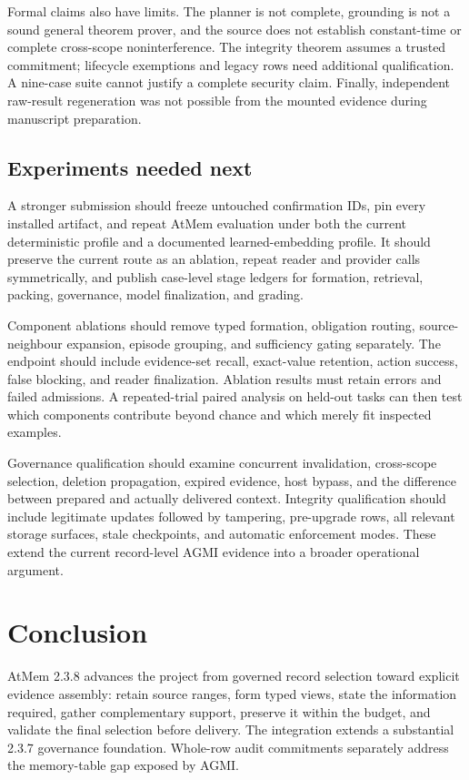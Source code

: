 \documentclass[11pt]{article}
\begin{document}
Formal claims also have limits. The planner is not complete, grounding is not a sound general theorem prover, and the source does not establish constant-time or complete cross-scope noninterference. The integrity theorem assumes a trusted commitment; lifecycle exemptions and legacy rows need additional qualification. A nine-case suite cannot justify a complete security claim. Finally, independent raw-result regeneration was not possible from the mounted evidence during manuscript preparation.

\subsection{Experiments needed next}
A stronger submission should freeze untouched confirmation IDs, pin every installed artifact, and repeat AtMem evaluation under both the current deterministic profile and a documented learned-embedding profile. It should preserve the current route as an ablation, repeat reader and provider calls symmetrically, and publish case-level stage ledgers for formation, retrieval, packing, governance, model finalization, and grading.

Component ablations should remove typed formation, obligation routing, source-neighbour expansion, episode grouping, and sufficiency gating separately. The endpoint should include evidence-set recall, exact-value retention, action success, false blocking, and reader finalization. Ablation results must retain errors and failed admissions. A repeated-trial paired analysis on held-out tasks can then test which components contribute beyond chance and which merely fit inspected examples.

Governance qualification should examine concurrent invalidation, cross-scope selection, deletion propagation, expired evidence, host bypass, and the difference between prepared and actually delivered context. Integrity qualification should include legitimate updates followed by tampering, pre-upgrade rows, all relevant storage surfaces, stale checkpoints, and automatic enforcement modes. These extend the current record-level AGMI evidence into a broader operational argument.

\section{Conclusion}
AtMem 2.3.8 advances the project from governed record selection toward explicit evidence assembly: retain source ranges, form typed views, state the information required, gather complementary support, preserve it within the budget, and validate the final selection before delivery. The integration extends a substantial 2.3.7 governance foundation. Whole-row audit commitments separately address the memory-table gap exposed by AGMI.
\end{document}
